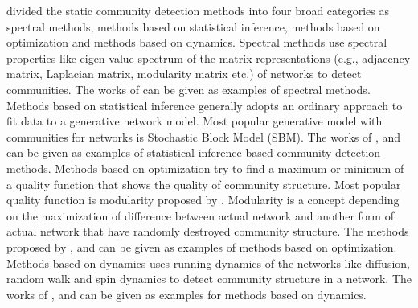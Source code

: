 \citet{waskiewicz2012friend} divided the static community detection methods into four broad categories as spectral methods, methods based on statistical inference, methods based on optimization and methods based on dynamics. Spectral methods use spectral properties like eigen value spectrum of the matrix representations (e.g., adjacency matrix, Laplacian matrix, modularity matrix etc.) of networks to detect communities.  The works of \citet{newman2006finding}\cite{newman2013spectral} can be given as examples of spectral methods. Methods based on statistical inference generally adopts an ordinary approach to fit data to a generative network model. Most popular generative model with communities for networks is Stochastic Block Model (SBM). The works of \citet{come2015model}, and \citet{newman2016estimating} can be given as examples of statistical inference-based community detection methods. Methods based on optimization try to find a maximum or minimum of a quality function that shows the quality of community structure. Most popular quality function is modularity proposed by \citet{newman2004finding}. Modularity is a concept depending on the maximization of difference between actual network and another form of actual network that have randomly destroyed community structure. The methods proposed by \citet{clauset2005finding}, and \citet{lancichinetti2011limits} can be given as examples of methods based on optimization. Methods based on dynamics uses running dynamics of the networks like diffusion, random walk and spin dynamics to detect community structure in a network. The works of \citet{reichardt2006statistical}, and \citet{rosvall2008maps} can be given as examples for methods based on dynamics.

\begin{comment}
\textcolor{magenta}{The matrix completion problem has been studied using GNNs. \citet{monti2017geometric} developed a multi-graph CNN (MGCNN) model to extract user and item latent features from their respective nearest-neighbor networks. \citet{berg2017graph} proposed graph convolutional matrix completion (GC-MC) which directly applies a GNN to the user-item bipartite graph to extract user and item latent features using a GNN. Although using GNNs for matrix completion, all these models are still transductive – MGCNN requires graph Laplacians which do not generalize to new graphs, while GC-MC uses one-hot encoding of node IDs as initial node features, thus cannot generalize to unseen users/items. A recent inductive graph-based recommender system, PinSage (\citet{ying2018graph}), uses node content as initial node features (instead of the one-hot encoding in GC-MC), and is successfully used in recommending related pins in Pinterest. \citet{zhanginductive} proposed an Inductive Graph-based Matrix Completion (IGMC) model which trains a graph neural network (GNN) based purely on 1-hop subgraphs around (user, item) pairs generated from the rating matrix and maps those subgraphs to their corresponding ratings.}
\end{comment}

